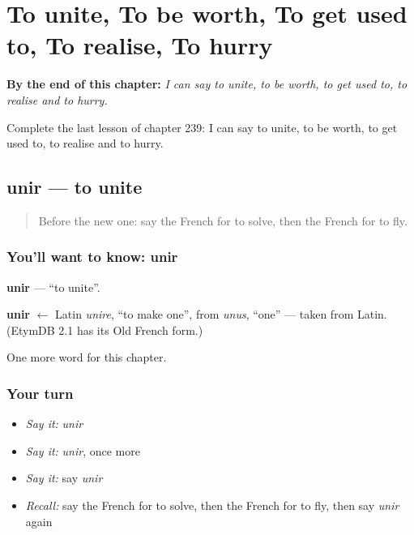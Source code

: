 
\chapter{To unite, To be worth, To get used to, To realise, To hurry}
\label{ch:fr-to-unite-to-be-worth-to-get-used-to-to-realise-to-hurry}

\begin{chapteropening}
\textbf{By the end of this chapter:} \emph{I can say to unite, to be worth, to get used to, to realise and to hurry.}

Complete the last lesson of chapter 239: I can say to unite, to be worth, to get used to, to realise and to hurry.
\end{chapteropening}

\section[unir]{unir — to unite}

\label{lesson:FR-C239-unir}



\begin{quote}
Before the new one: say the French for to solve, then the French for to fly.
\end{quote}

\subsection*{You'll want to know: unir}
\textbf{unir} — \textquotedblleft{}to unite\textquotedblright{}.

\begin{cousinweb}
\textbf{unir} $\leftarrow$ Latin \emph{unire}, \textquotedblleft{}to make one\textquotedblright{}, from \emph{unus}, \textquotedblleft{}one\textquotedblright{} — taken from Latin. (EtymDB 2.1 has its Old French form.)
\end{cousinweb}

\begin{grammarlens}[title={What you've built}]
One more word for this chapter.
\end{grammarlens}

\subsection*{Your turn}
\begin{itemize}
\raggedright
  \item \emph{Say it:} \emph{unir}
  \item \emph{Say it:} \emph{unir}, once more
  \item \emph{Say it:} say \emph{unir}
  \item \emph{Recall:} say the French for to solve, then the French for to fly, then say \emph{unir} again
\end{itemize}

